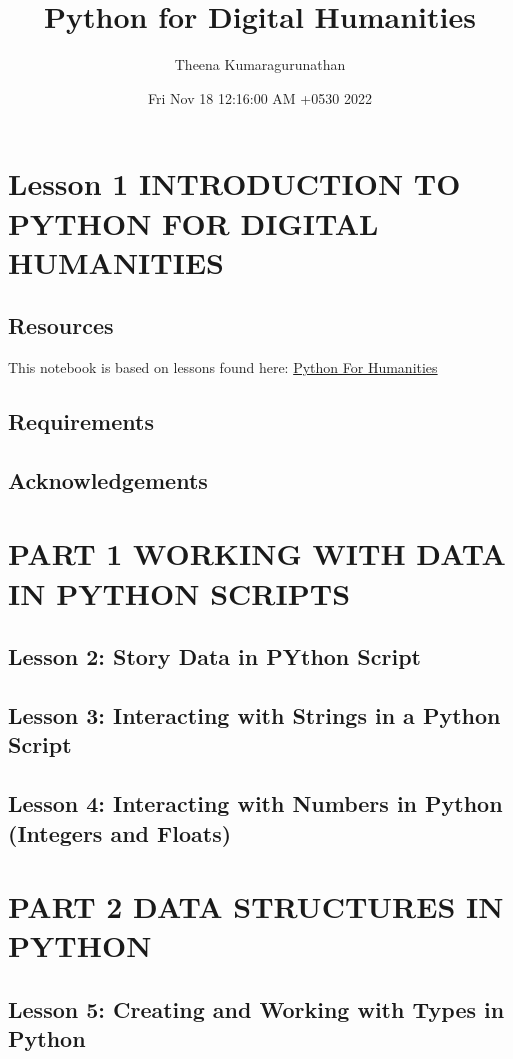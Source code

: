 \documentclass[11pt]{article}
\author{Theena Kumaragurunathan}
\date{Fri Nov 18 12:16:00 AM +0530 2022}
\title{Python for Digital Humanities}
\begin{document}
\maketitle
\tableofcontents


\section{Lesson 1 INTRODUCTION TO PYTHON FOR DIGITAL HUMANITIES}
\label{sec:orgdfb8f5f}
\subsection{Resources}
\label{sec:org6359d6f}
This notebook is based on lessons found here: \href{https://pythonhumanities.com/}{Python For Humanities}
\subsection{Requirements}
\label{sec:org72028de}
\subsection{Acknowledgements}
\label{sec:orgbe4ed80}
\section{PART 1 WORKING WITH DATA IN PYTHON SCRIPTS}
\label{sec:org876d0b9}
\subsection{Lesson 2: Story Data in PYthon Script}
\label{sec:orgf7efd25}
\subsection{Lesson 3: Interacting with Strings in a Python Script}
\label{sec:org07c6911}
\subsection{Lesson 4: Interacting with Numbers in Python (Integers and Floats)}
\label{sec:org82c9e2b}
\section{PART 2 DATA STRUCTURES IN PYTHON}
\label{sec:org2c46c6e}
\subsection{Lesson 5: Creating and Working with Types in Python}
\label{sec:org14f7afc}
\end{document}
